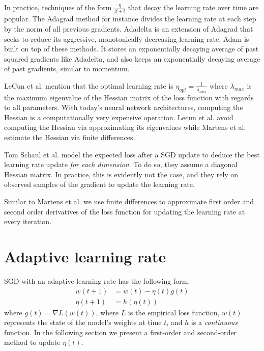 \documentclass{article}
\begin{document}
  In practice, techniques of the form $\frac{\eta}{\beta+t}$ that decay the learning rate over time are popular. The Adagrad method \cite{duchi2011adaptive} for instance divides the learning rate at each step by the norm of all previous gradients. Adadelta \cite{zeiler2012adadelta} is an extension of Adagrad that seeks to reduce its aggressive, monotonically decreasing learning rate. Adam \cite{kingma2014adam} is built on top of these methods. It stores an exponentially decaying average of past squared gradients like Adadelta, and also keeps an exponentially decaying average of past gradients, similar to momentum.
  
  LeCun et al. \cite{lecun1998gradient} mention that the optimal learning rate is $\eta_{opt} = \frac{1}{\lambda_{max}}$ where $\lambda_{max}$ is the maximum eigenvalue of the Hessian matrix of the loss function with regards to all parameters. With today's neural network architectures, computing the Hessian is a computationally very expensive operation. Lecun et al. avoid computing the Hessian via approximating its eigenvalues while Martens et al. \cite{martens2010deep} estimate the Hessian via finite differences.
  
  Tom Schaul et al. \cite{schaul2013no} model the expected loss after a SGD update to deduce the best learning rate update \emph{for each dimension}. To do so, they assume a diagonal Hessian matrix. In practice, this is evidently not the case, and they rely on observed samples of the gradient to update the learning rate.
  
  Similar to Martens et al. \cite{martens2010deep} we use finite differences to approximate first order and second order derivatives of the loss function for updating the learning rate at every iteration.
  
  
  
  \section{Adaptive learning rate}
  
  SGD with an adaptive learning rate has the following form:\\
  \begin{align}
  w(t+1) &= w(t) -\eta(t)g(t)\\
  \eta(t+1) &= h(\eta(t))
  \end{align}
  where $g(t) = \nabla L(w(t))$, where $L$ is the empirical loss function, $w(t)$ represents the state of the model's weights at time $t$, and $h$ is a \emph{continuous} function. In the following section we present a first-order and second-order method to update $\eta(t)$.
  
\end{document}

